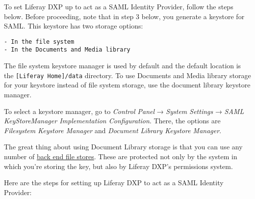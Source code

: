 To set Liferay DXP up to act as a SAML Identity Provider, follow the
steps below. Before proceeding, note that in step 3 below, you generate
a keystore for SAML. This keystore has two storage options:

\begin{verbatim}
- In the file system
- In the Documents and Media library
\end{verbatim}

The file system keystore manager is used by default and the default
location is the \texttt{{[}Liferay\ Home{]}/data} directory. To use
Documents and Media library storage for your keystore instead of file
system storage, use the document library keystore manager.

To select a keystore manager, go to \emph{Control Panel} → \emph{System
Settings} → \emph{SAML KeyStoreManager Implementation Configuration}.
There, the options are \emph{Filesystem Keystore Manager} and
\emph{Document Library Keystore Manager}.

The great thing about using Document Library storage is that you can use
any number of
\href{/docs/7-0/deploy/-/knowledge_base/d/document-repository-configuration}{back
end file stores}. These are protected not only by the system in which
you're storing the key, but also by Liferay DXP's permissions system.

Here are the steps for setting up Liferay DXP to act as a SAML Identity
Provider:


